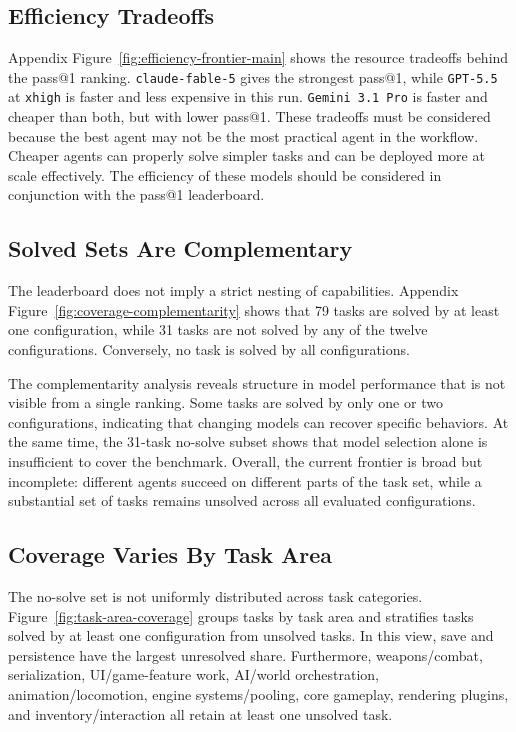 \documentclass[11pt]{article}
\begin{document}
\subsection{Efficiency Tradeoffs}

Appendix Figure~\ref{fig:efficiency-frontier-main} shows the resource tradeoffs behind the pass@1 ranking. \texttt{claude-fable-5} gives the strongest pass@1, while \texttt{GPT-5.5} at \texttt{xhigh} is faster and less expensive in this run. \texttt{Gemini 3.1 Pro} is faster and cheaper than both, but with lower pass@1. These tradeoffs must be considered because the best agent may not be the most practical agent in the workflow. Cheaper agents can properly solve simpler tasks and can be deployed more at scale effectively. The efficiency of these models should be considered in conjunction with the pass@1 leaderboard.

\subsection{Solved Sets Are Complementary}
The leaderboard does not imply a strict nesting of capabilities. Appendix Figure~\ref{fig:coverage-complementarity} shows that 79 tasks are solved by at least one configuration, while 31 tasks are not solved by any of the twelve configurations. Conversely, no task is solved by all configurations.

\FloatBarrier

The complementarity analysis reveals structure in model performance that is not visible from a single ranking. Some tasks are solved by only one or two configurations, indicating that changing models can recover specific behaviors. At the same time, the 31-task no-solve subset shows that model selection alone is insufficient to cover the benchmark. Overall, the current frontier is broad but incomplete: different agents succeed on different parts of the task set, while a substantial set of tasks remains unsolved across all evaluated configurations.

\subsection{Coverage Varies By Task Area}
The no-solve set is not uniformly distributed across task categories. Figure~\ref{fig:task-area-coverage} groups tasks by task area and stratifies tasks solved by at least one configuration from unsolved tasks. In this view, save and persistence have the largest unresolved share. Furthermore, weapons/combat, serialization, UI/game-feature work, AI/world orchestration, animation/locomotion, engine systems/pooling, core gameplay, rendering plugins, and inventory/interaction all retain at least one unsolved task.
\end{document}
